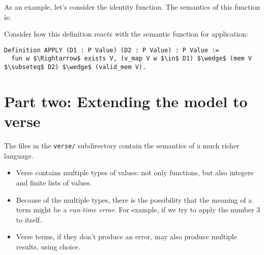 \documentclass{article}
\theoremstyle{definition}
\newcommand{\codeplus}[3]{%
  }
\begin{document}
As an example, let's consider the identity function. The 
semantics of this function is:

\codeplus{../coq/simple/model.v}{idset}{} 

Consider how this definition reacts with the semantic function for application:

\begin{lstlisting}[language=Coq,mathescape]
Definition APPLY (D1 : P Value) (D2 : P Value) : P Value :=
  fun w $\Rightarrow$ exists V, (v_map V w $\in$ D1) $\wedge$ (mem V $\subseteq$ D2) $\wedge$ (valid_mem V).
\end{lstlisting}

\section{Part two: Extending the model to verse}

The files in the  \texttt{verse/} subdirectory contain the semantics of a much richer language.

\begin{itemize}
\item Verse contains multiple types of values: not only functions, but also integers and finite lists of values.
\item Because of the multiple types, there is the possibility
that the meaning of a term might be a \emph{run-time error}. For
example, if we try to apply the number 3 to itself.
\item Verse terms, if they don't produce an error, may also 
  produce multiple results, using choice.
\end{itemize}
\end{document}
